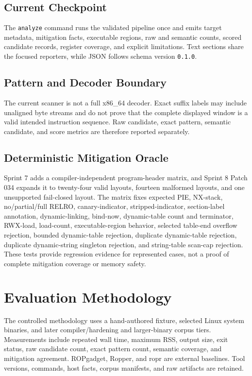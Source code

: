 \documentclass[conference]{IEEEtran}
\begin{document}
\subsection{Current Checkpoint}
The \texttt{analyze} command runs the validated pipeline once and emits target metadata, mitigation facts, executable regions, raw and semantic counts, scored candidate records, register coverage, and explicit limitations. Text sections share the focused reporters, while JSON follows schema version \texttt{0.1.0}.

\subsection{Pattern and Decoder Boundary}
The current scanner is not a full x86\_64 decoder. Exact suffix labels may include unaligned byte streams and do not prove that the complete displayed window is a valid intended instruction sequence. Raw candidate, exact pattern, semantic candidate, and score metrics are therefore reported separately.

\subsection{Deterministic Mitigation Oracle}
Sprint 7 adds a compiler-independent program-header matrix, and Sprint 8 Patch 034 expands it to twenty-four valid layouts, fourteen malformed layouts, and one unsupported fail-closed layout. The matrix fixes expected PIE, NX-stack, no/partial/full RELRO, canary-indicator, stripped-indicator, section-label annotation, dynamic-linking, bind-now, dynamic-table count and terminator, RWX-load, load-count, executable-region behavior, selected table-end overflow rejection, bounded dynamic-table rejection, duplicate dynamic-table rejection, duplicate dynamic-string singleton rejection, and string-table scan-cap rejection. These tests provide regression evidence for represented cases, not a proof of complete mitigation coverage or memory safety.

\section{Evaluation Methodology}
The controlled methodology uses a hand-authored fixture, selected Linux system binaries, and later compiler/hardening and larger-binary corpus tiers. Measurements include repeated wall time, maximum RSS, output size, exit status, raw candidate count, exact pattern count, semantic coverage, and mitigation agreement. ROPgadget, Ropper, and ropr are external baselines. Tool versions, commands, host facts, corpus manifests, and raw artifacts are retained.
\end{document}
